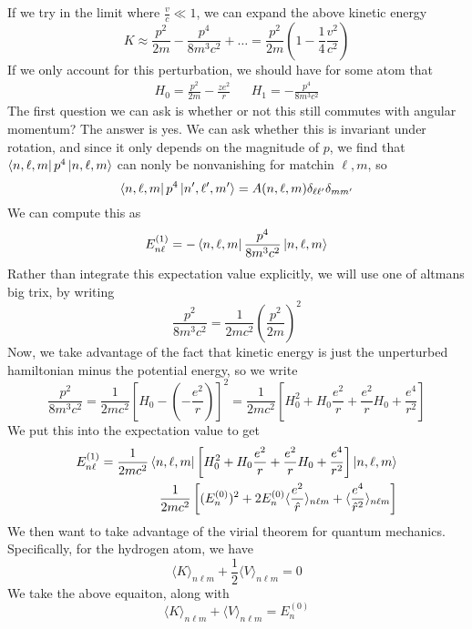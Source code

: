 \documentclass{article}
\theoremstyle{definition}
\begin{document}
If we try in the limit where $\frac{v}{c}\ll 1$, we can expand the above kinetic energy
\begin{equation}
	K\approx \frac{p^2}{2m}-\frac{p^4}{8m^3c^2}+\dots=\frac{p^2}{2m}\left(1-\frac{1}{4}\frac{v^2}{c^2}\right)
\end{equation}
If we only account for this perturbation, we should have for some atom that 
\begin{align}
	H_0=\frac{p^2}{2m}-\frac{ze^2}{r}
	&&
	H_1=-\frac{p^4}{8m^3c^2}
\end{align}
The first question we can ask is whether or not this still commutes with angular momentum? The answer is yes. We can ask whether this is invariant under rotation, and since it only depends on the magnitude of $p$, we find that $\bra{n,\ell,m}p^4\ket{n,\ell,m}$  can nonly be nonvanishing for matchin $\ell,m$, so
\begin{equation}
	\bra{n,\ell,m}p^4\ket{n',\ell',m'}=A(n,\ell,m)\delta_{\ell\ell'}\delta_{mm'}
\end{equation}
We can compute this as
\begin{equation}
	E_{n\ell}^{(1)}=-\bra{n,\ell,m}\frac{p^4}{8m^3c^2}\ket{n,\ell,m}
\end{equation}
Rather than integrate this expectation value explicitly, we will use one of altmans big trix, by writing
\begin{equation}
	\frac{p^2}{8m^3c^2}=\frac{1}{2mc^2}\left(\frac{p^2}{2m}\right)^2
\end{equation}
Now, we take advantage of the fact that kinetic energy is just the unperturbed hamiltonian minus the potential energy, so we write
\begin{equation}
	\frac{p^2}{8m^3c^2}
	=
	\frac{1}{2mc^2}\left[H_0-\left(-\frac{e^2}{r}\right)\right]^2
	=
	\frac{1}{2mc^2}\left[
		H_0^2+H_0\frac{e^2}{r}+\frac{e^2}{r}H_0+\frac{e^4}{r^2}
		\right]
\end{equation}
We put this into the expectation value to get
\begin{align}
	E_{n\ell}^{(1)}=\frac{1}{2mc^2}\bra{n,\ell,m}
	\left[
		H_0^2+H_0\frac{e^2}{r}+\frac{e^2}{r}H_0+\frac{e^4}{r^2}
	\right]
	\ket{n,\ell,m}
	\\
	\frac{1}{2mc^2}\left[
		(E_n^{(0)})^2+2E_n^{(0)}\langle\frac{e^2}{\hat r}\rangle_{n\ell m}+\langle\frac{e^4}{\hat r^2}\rangle_{n\ell m}
		\right]
\end{align}
We then want to take advantage of the virial theorem for quantum mechanics. Specifically, for the hydrogen atom, we have
\begin{equation}
	\langle K\rangle_{n\ell m}+\frac{1}{2}\langle V\rangle_{n\ell m}=0
\end{equation}
We take the above equaiton, along with
\begin{equation}
	\langle K\rangle_{n\ell m}+\langle V\rangle_{n\ell m}=E_n^{(0)}
\end{equation}
\end{document}
